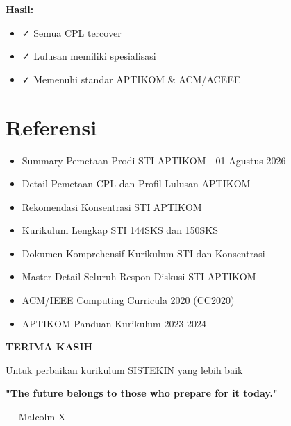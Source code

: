 \documentclass[12pt,a4paper]{report}
\newcommand{\sectioncolor}[1]{\colorbox{secondary}{\parbox{\dimexpr\linewidth-2\fboxsep}{\strut #1}}}
\begin{document}
\bigskip
\sectioncolor{\Large\bfseries Hasil:}

\begin{itemize}
\item \color{green}\textsf{✓} Semua CPL tercover
\item \color{green}\textsf{✓} Lulusan memiliki spesialisasi
\item \color{green}\textsf{✓} Memenuhi standar APTIKOM & ACM/ACEEE
\end{itemize}

\newpage

\chapter*{Referensi}

\begin{itemize}
\item [001] Summary Pemetaan Prodi STI APTIKOM - 01 Agustus 2026
\item [002] Detail Pemetaan CPL dan Profil Lulusan APTIKOM
\item [003] Rekomendasi Konsentrasi STI APTIKOM
\item [004] Kurikulum Lengkap STI 144SKS dan 150SKS
\item [005] Dokumen Komprehensif Kurikulum STI dan Konsentrasi
\item [006] Master Detail Seluruh Respon Diskusi STI APTIKOM
\item ACM/IEEE Computing Curricula 2020 (CC2020)
\item APTIKOM Panduan Kurikulum 2023-2024
\end{itemize}

\newpage

\begin{center}
\pagecolor{lightgray}
\vspace*{5cm}

{\Huge\bfseries\headingfont\color{primary} TERIMA KASIH}\vspace{1cm}

{\Large\headingfont\color{darkgray} Untuk perbaikan kurikulum SISTEKIN yang lebih baik}\vspace{2cm}

{\large\bfseries\headingfont\color{accent} "The future belongs to those who prepare for it today."}\vspace{0.5cm}

{\large\headingfont\color{darkgray} — Malcolm X}

\vfill
\end{center}
\end{document}
